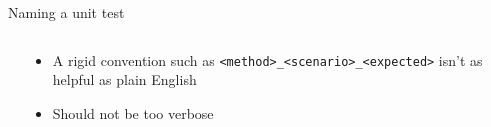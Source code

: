 \documentclass[english,handout,10pt,aspectratio=169,t]{beamer}
\begin{document}
\begin{frame}{Naming a unit test}
  \begin{columns}[T]
    \begin{column}[]{0.55\textwidth}
      \begin{minipage}{\linewidth}
        \rigidname
        \verbosename
        \concisename
      \end{minipage}
    \end{column}
    \begin{column}[]{0.45\textwidth}
      \begin{itemize}
        \item A rigid convention such as \texttt{<method>\_<scenario>\_<expected>}
        isn't as helpful as plain English
        \item Should not be too verbose
      \end{itemize}
    \end{column}
  \end{columns}
\end{frame}
\end{document}
